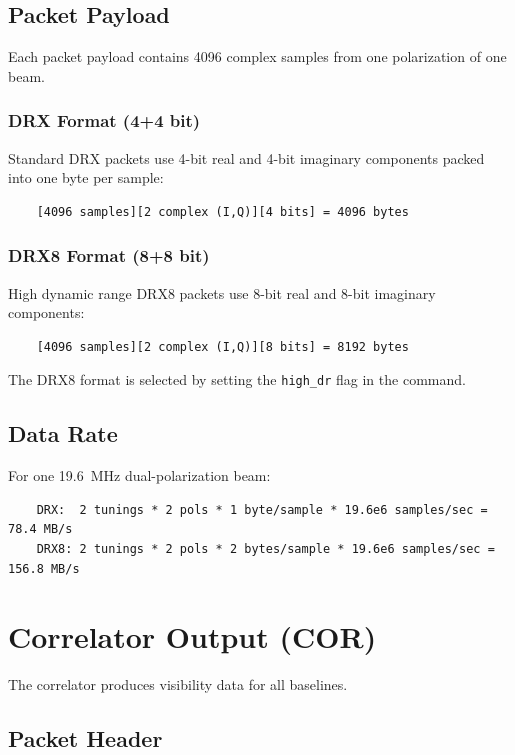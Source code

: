 \subsection{Packet Payload}

Each packet payload contains 4096 complex samples from one polarization of one beam.

\subsubsection{DRX Format (4+4 bit)}

Standard DRX packets use 4-bit real and 4-bit imaginary components packed into one byte per sample:

\begin{verbatim}
    [4096 samples][2 complex (I,Q)][4 bits] = 4096 bytes
\end{verbatim}

\subsubsection{DRX8 Format (8+8 bit)}

High dynamic range DRX8 packets use 8-bit real and 8-bit imaginary components:

\begin{verbatim}
    [4096 samples][2 complex (I,Q)][8 bits] = 8192 bytes
\end{verbatim}

The DRX8 format is selected by setting the \texttt{high\_dr} flag in the  command.

\subsection{Data Rate}

For one 19.6~MHz dual-polarization beam:
\begin{verbatim}
    DRX:  2 tunings * 2 pols * 1 byte/sample * 19.6e6 samples/sec = 78.4 MB/s
    DRX8: 2 tunings * 2 pols * 2 bytes/sample * 19.6e6 samples/sec = 156.8 MB/s
\end{verbatim}

\section{Correlator Output (COR)}

The correlator produces visibility data for all baselines.

\subsection{Packet Header}

